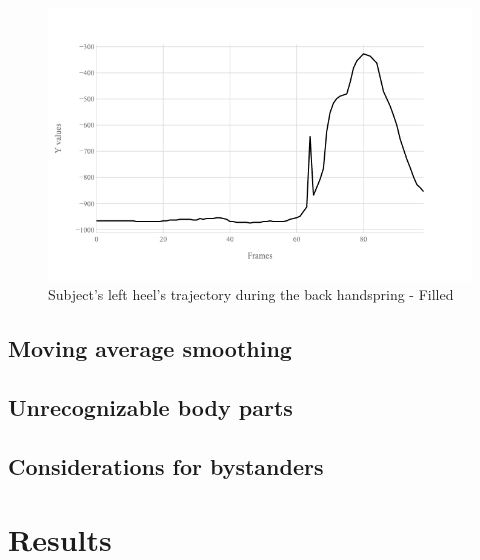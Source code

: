\begin{figure}[htb]
  \centering
    \includegraphics[width=\textwidth,keepaspectratio]
    {images/data-preprocessing/flack-17-rasmus-l-heel-y-filled}
    \caption{Subject's left heel's trajectory during the back handspring - Filled}
    \label{lack-17-rasmus-l-heel-y-filled}
\end{figure}

\subsection{Moving average smoothing}

\subsection{Unrecognizable body parts}

\subsection{Considerations for bystanders}

\section{Results}
\label{pre-processing-results}



